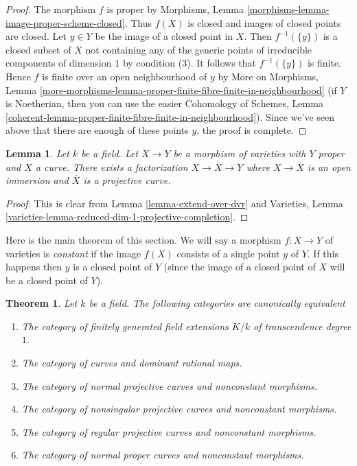 \documentclass{stacks-project}
\theoremstyle{plain}
\newtheorem{theorem}[subsection]{Theorem}
\newtheorem{lemma}[subsection]{Lemma}
\theoremstyle{definition}
\theoremstyle{remark}
\numberwithin{equation}{subsection}
\begin{document}
\begin{proof}
The morphism $f$ is proper by
Morphisms, Lemma \ref{morphisms-lemma-image-proper-scheme-closed}.
Thus $f(X)$ is closed and images of closed points are closed.
Let $y \in Y$ be the image of a closed point in $X$.
Then $f^{-1}(\{y\})$ is a closed subset of $X$ not
containing any of the generic points of irreducible components
of dimension $1$ by condition (3). It follows that $f^{-1}(\{y\})$
is finite. Hence $f$ is finite over an open neighbourhood of $y$
by
More on Morphisms, Lemma
\ref{more-morphisms-lemma-proper-finite-fibre-finite-in-neighbourhood}
(if $Y$ is Noetherian, then you can use the easier
Cohomology of Schemes, Lemma
\ref{coherent-lemma-proper-finite-fibre-finite-in-neighbourhood}).
Since we've seen above that there are enough of these points
$y$, the proof is complete.
\end{proof}

\begin{lemma}
\label{lemma-extend-to-completion}
Let $k$ be a field. Let $X \to Y$ be a morphism of varieties
with $Y$ proper and $X$ a curve.
There exists a factorization $X \to \overline{X} \to Y$
where $X \to \overline{X}$ is an open immersion
and $\overline{X}$ is a projective curve.
\end{lemma}

\begin{proof}
This is clear from Lemma \ref{lemma-extend-over-dvr}
and Varieties, Lemma \ref{varieties-lemma-reduced-dim-1-projective-completion}.
\end{proof}

\noindent
Here is the main theorem of this section. We will say a morphism
$f : X \to Y$ of varieties is {\it constant} if the image $f(X)$
consists of a single point $y$ of $Y$. If this happens then
$y$ is a closed point of $Y$ (since the image of a closed point
of $X$ will be a closed point of $Y$).

\begin{theorem}
\label{theorem-curves-rational-maps}
Let $k$ be a field. The following categories are canonically equivalent
\begin{enumerate}
\item The category of finitely generated field extensions $K/k$ of
transcendence degree $1$.
\item The category of curves and dominant rational maps.
\item The category of normal projective curves and nonconstant morphisms.
\item The category of nonsingular projective curves and nonconstant morphisms.
\item The category of regular projective curves and nonconstant morphisms.
\item The category of normal proper curves and nonconstant morphisms.
\end{enumerate}
\end{theorem}
\end{document}
